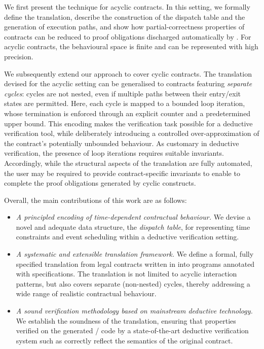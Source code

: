 We first present the technique for acyclic {\Stipula} contracts. In
this setting, we formally define the translation, describe the
construction of the dispatch table and the generation of execution
paths, and show how partial-correctness properties of contracts can be
reduced to proof obligations discharged automatically by {\KeY}. For
acyclic contracts, the behavioural space is finite and can be
represented with high precision.

We subsequently extend our approach to cover cyclic contracts. The
translation devised for the acyclic setting can be generalised to
contracts featuring \emph{separate cycles}: cycles are not
nested, even if multiple paths between their entry/exit states
are permitted. Here, each cycle is mapped to a bounded {\Java} loop
iteration, whose termination is enforced through an explicit counter
and a predetermined upper bound.  This encoding makes the verification
task possible for a deductive verification tool, while
deliberately introducing a controlled over-approximation of the
contract's potentially unbounded behaviour. As customary in deductive
verification, the presence of loop iterations requires suitable
invariants. Accordingly, while the structural aspects of the
translation are fully automated, the user may be required to provide
contract-specific invariants to enable {\KeY} to complete the proof
obligations generated by cyclic constructs.

Overall, the main contributions of this work are as follows:
%
\begin{itemize}
\item \emph{A principled encoding of time-dependent contractual
    behaviour.}  We devise a novel and adequate data structure, the
  \emph{dispatch table}, for representing time constraints and event
  scheduling within a deductive verification setting.
\item \emph{A systematic and extensible translation framework.}  We
  define a formal, fully specified translation from legal contracts
  written in {\Stipula} into {\Java} programs annotated with {\JML}
  specifications. The translation is not limited to acyclic
  interaction patterns, but also covers separate (non-nested) cycles, 
  thereby addressing a wide range of
  realistic contractual behaviour.
\item \emph{A sound verification methodology based on mainstream
    deductive technology.}  We establish the soundness of the
  translation, ensuring that properties verified on the generated
  {\JML}/{\Java} code by a state-of-the-art deductive verification
  system such as {\KeY} correctly reflect the semantics of the
  original contract.
\end{itemize}

